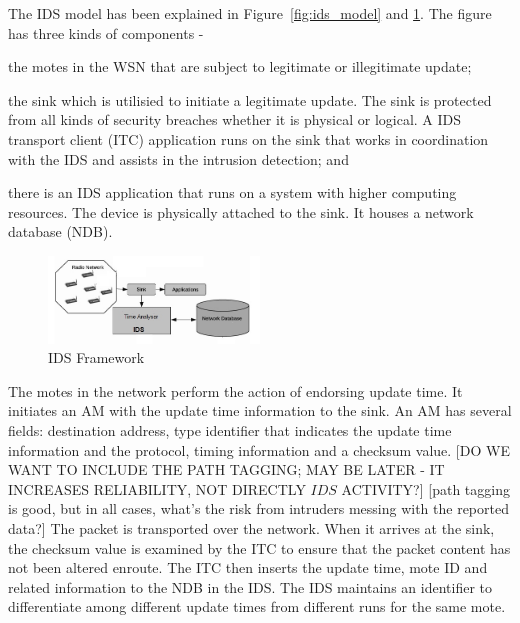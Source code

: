 \documentclass[conference,final]{IEEEtran}
\begin{document}
The IDS model has been explained in Figure~\ref{fig:ids_model} and \ref{fig:ids_fw}.
The figure has three kinds of components - 
\begin{inparaenum}
\item the motes in the WSN that are subject to legitimate or illegitimate update; 
\item the sink which is utilisied to initiate a legitimate update. 
The sink is protected from all kinds of security breaches whether it is physical or logical. 
A IDS transport client (ITC) application runs on the sink that works in coordination with the IDS and assists in the intrusion detection; and
\item there is an IDS application that runs on a system with higher computing resources. 
The device is physically attached to the sink.
It houses a network database (NDB).
\end{inparaenum}

\begin{figure}[btp]
    \centering
    \includegraphics[width=0.5\textwidth]{IDS_fw}	
    \caption{IDS Framework}
    \label{fig:ids_fw}
\end{figure}

The motes in the network perform the action of endorsing update time. 
It initiates an AM with the update time information to the sink. 
An AM has several fields: destination address, type identifier that indicates the update time information and the protocol, timing information and a checksum value.
[DO WE WANT TO INCLUDE THE PATH TAGGING; MAY BE LATER - IT INCREASES RELIABILITY, NOT DIRECTLY $IDS$ ACTIVITY?]
[path tagging is good, but in all cases, what’s the risk from intruders messing with the reported data?]
The packet is transported over the network.
When it arrives at the sink, the checksum value is examined by the ITC to ensure that the packet content has not been altered enroute.
The ITC then inserts the update time, mote ID and related information to the NDB in the IDS.
The IDS maintains an identifier to differentiate among different update times from different runs for the same mote.
\end{document}
